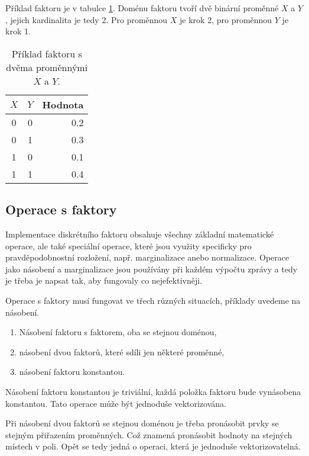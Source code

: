 Příklad faktoru je v tabulce \ref{tab:stride}.
Doménu faktoru tvoří dvě binární proměnné $X$ a $Y$, jejich kardinalita je tedy 2.
Pro proměnnou $X$ je krok 2, pro proměnnou $Y$ je krok 1.

\begin{table}
\begin{center}
\begin{tabular}{|c|c|r|}
\hline
$X$ & $Y$ & Hodnota \\
\hline
\hline
0 & 0 & 0.2 \\
\hline
0 & 1 & 0.3 \\
\hline
1 & 0 & 0.1 \\
\hline
1 & 1 & 0.4 \\
\hline
\end{tabular}
\end{center}
\caption{Příklad faktoru s dvěma proměnnými $X$ a $Y$.}
\label{tab:stride}
\end{table}

\subsection{Operace s faktory}

Implementace diskrétního faktoru obsahuje všechny základní matematické operace, ale také speciální operace, které jsou využity specificky pro pravděpodobnostní rozložení, např. marginalizace anebo normalizace.
Operace jako násobení a marginalizace jsou používány při každém výpočtu zprávy a tedy je třeba je napsat tak, aby fungovaly co nejefektivněji.

Operace s faktory musí fungovat ve třech různých situacích, příklady uvedeme na násobení.
\begin{enumerate}
    \item Násobení faktoru s faktorem, oba se stejnou doménou,
    \item násobení dvou faktorů, které sdíli jen některé proměnné,
    \item násobení faktoru konstantou.
\end{enumerate}

Násobení faktoru konstantou je triviální, každá položka faktoru bude vynásobena konstantou.
Tato operace může být jednoduše vektorizována.

Při násobení dvou faktorů se stejnou doménou je třeba pronásobit prvky se stejným přiřazením proměnných.
Což znamená pronásobit hodnoty na stejných místech v poli.
Opět se tedy jedná o operaci, která je jednoduše vektorizovatelná.

